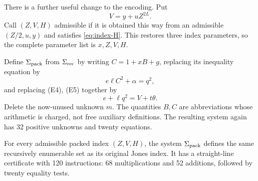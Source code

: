 There is a further useful change to the encoding. Put
\begin{equation}
 V=y+uZ^{2L}.\label{eq:packed-index}
\end{equation}
Call $(Z,V,H)$ admissible if it is obtained this way from an admissible
$(Z/2,u,y)$ and satisfies \eqref{eq:index-H}. This restores three index
parameters, so the complete parameter list is $x,Z,V,H$.

Define $\Sigma_{\rm pack}$ from $\Sigma_{\rm rec}$ by writing
$C=1+xB+g$, replacing its inequality equation by
\begin{equation}
 e\ell C^2+\alpha=q^2,\label{eq:packed-bound}
\end{equation}
and replacing (E4), (E5) together by
\begin{equation}
 e+\ell q^2=V+t\theta.\label{eq:packed-congruence}
\end{equation}
Delete the now-unused unknown $m$. The quantities $B,C$ are abbreviations
whose arithmetic is charged, not free auxiliary definitions. The resulting
system again has 32 positive unknowns and twenty equations.

\begin{theorem}\label{thm:120}
For every admissible packed index $(Z,V,H)$, the system
$\Sigma_{\rm pack}$ defines the same recursively enumerable set as its
original Jones index. It has a straight-line certificate with 120
instructions: 68 multiplications and 52 additions, followed by twenty
equality tests.
\end{theorem}

